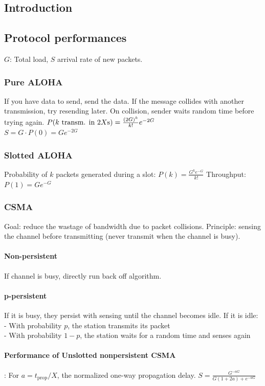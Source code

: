 \documentclass[6pt]{scrartcl}
\begin{document}
\begin{multicols}{4}
\section{Introduction}
\subsection{Protocol performances}
$G$: Total load, $S$ arrival rate of new packets. 
\subsubsection{Pure ALOHA} If you have data to send, send the data. If the message collides with another transmission, try resending later. On collision, sender waits random time before trying again.
$P(k \text{ transm. in } 2X\text s) = \frac{(2G)^k}{k!} e^{-2G}$\\
$S = G \cdot P(0) = Ge^{-2G}$


\subsubsection{Slotted ALOHA} 
Probability of $k$ packets generated during a slot:
$P(k) = \frac{G^ke^{-G}}{k!}$
Throughput:
$P(1) = Ge^{-G}$

\subsubsection{CSMA}
Goal: reduce the wastage of bandwidth due to packet collisions.
Principle: sensing the channel before transmitting (never transmit when the channel is busy).
\paragraph{Non-persistent} If channel is busy, directly run back off algorithm.
\paragraph{p-persistent} If it is busy, they persist with sensing until the channel becomes idle. If it is idle:\\
- With probability $p$, the station transmits its packet\\
- With probability $1-p$, the station waits for a random time and senses again

\paragraph{Performance of Unslotted nonpersistent CSMA}:
For $a=t_\textrm{prop}/X$, the normalized one-way propagation delay.
$S = \frac{G^{-aG}}{G(1+2a)+e^{-aG}}$


\end{multicols}
\end{document}
